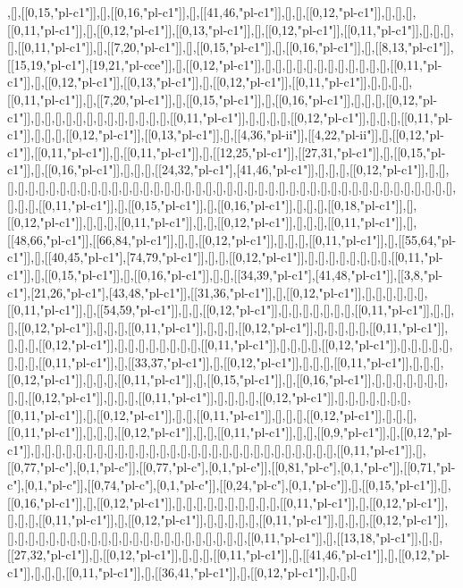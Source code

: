 ,[],[[0,15,"pl-c1"]],[],[[0,16,"pl-c1"]],[],[[41,46,"pl-c1"]],[],[],[[0,12,"pl-c1"]],[],[],[],[[0,11,"pl-c1"]],[],[[0,12,"pl-c1"]],[[0,13,"pl-c1"]],[],[[0,12,"pl-c1"]],[[0,11,"pl-c1"]],[],[],[],[],[[0,11,"pl-c1"]],[],[[7,20,"pl-c1"]],[],[[0,15,"pl-c1"]],[],[[0,16,"pl-c1"]],[],[[8,13,"pl-c1"]],[[15,19,"pl-c1"],[19,21,"pl-cce"]],[],[[0,12,"pl-c1"]],[],[],[],[],[],[],[],[],[],[],[],[],[[0,11,"pl-c1"]],[],[[0,12,"pl-c1"]],[[0,13,"pl-c1"]],[],[[0,12,"pl-c1"]],[[0,11,"pl-c1"]],[],[],[],[],[[0,11,"pl-c1"]],[],[[7,20,"pl-c1"]],[],[[0,15,"pl-c1"]],[],[[0,16,"pl-c1"]],[],[],[],[[0,12,"pl-c1"]],[],[],[],[],[],[],[],[],[],[],[],[],[],[[0,11,"pl-c1"]],[],[],[],[],[[0,12,"pl-c1"]],[],[],[],[[0,11,"pl-c1"]],[],[],[],[[0,12,"pl-c1"]],[[0,13,"pl-c1"]],[],[[4,36,"pl-ii"]],[[4,22,"pl-ii"]],[],[[0,12,"pl-c1"]],[[0,11,"pl-c1"]],[],[[0,11,"pl-c1"]],[],[[12,25,"pl-c1"]],[[27,31,"pl-c1"]],[],[[0,15,"pl-c1"]],[],[[0,16,"pl-c1"]],[],[],[],[[24,32,"pl-c1"],[41,46,"pl-c1"]],[],[],[],[[0,12,"pl-c1"]],[],[],[],[],[],[],[],[],[],[],[],[],[],[],[],[],[],[],[],[],[],[],[],[],[],[],[],[],[],[],[],[],[],[],[],[],[],[],[],[],[],[],[],[],[],[],[],[],[[0,11,"pl-c1"]],[],[[0,15,"pl-c1"]],[],[[0,16,"pl-c1"]],[],[],[],[[0,18,"pl-c1"]],[],[[0,12,"pl-c1"]],[],[],[],[[0,11,"pl-c1"]],[],[],[[0,12,"pl-c1"]],[],[],[],[[0,11,"pl-c1"]],[],[[48,66,"pl-c1"]],[[66,84,"pl-c1"]],[],[],[[0,12,"pl-c1"]],[],[],[],[[0,11,"pl-c1"]],[],[[55,64,"pl-c1"]],[],[[40,45,"pl-c1"],[74,79,"pl-c1"]],[],[],[[0,12,"pl-c1"]],[],[],[],[],[],[],[],[],[[0,11,"pl-c1"]],[],[[0,15,"pl-c1"]],[],[[0,16,"pl-c1"]],[],[],[[34,39,"pl-c1"],[41,48,"pl-c1"]],[[3,8,"pl-c1"],[21,26,"pl-c1"],[43,48,"pl-c1"]],[[31,36,"pl-c1"]],[],[[0,12,"pl-c1"]],[],[],[],[],[],[],[[0,11,"pl-c1"]],[],[[54,59,"pl-c1"]],[],[],[[0,12,"pl-c1"]],[],[],[],[],[],[],[],[[0,11,"pl-c1"]],[],[],[],[[0,12,"pl-c1"]],[],[],[],[[0,11,"pl-c1"]],[],[],[],[[0,12,"pl-c1"]],[],[],[],[],[],[[0,11,"pl-c1"]],[],[],[],[[0,12,"pl-c1"]],[],[],[],[],[],[],[],[],[[0,11,"pl-c1"]],[],[],[],[],[[0,12,"pl-c1"]],[],[],[],[],[],[],[],[],[[0,11,"pl-c1"]],[],[[33,37,"pl-c1"]],[],[[0,12,"pl-c1"]],[],[],[],[[0,11,"pl-c1"]],[],[],[],[[0,12,"pl-c1"]],[],[],[],[[0,11,"pl-c1"]],[],[[0,15,"pl-c1"]],[],[[0,16,"pl-c1"]],[],[],[],[],[],[],[],[],[],[[0,12,"pl-c1"]],[],[],[],[[0,11,"pl-c1"]],[],[],[],[],[[0,12,"pl-c1"]],[],[],[],[],[],[],[],[[0,11,"pl-c1"]],[],[[0,12,"pl-c1"]],[],[],[[0,11,"pl-c1"]],[],[],[],[[0,12,"pl-c1"]],[],[],[],[[0,11,"pl-c1"]],[],[],[],[[0,12,"pl-c1"]],[],[],[[0,11,"pl-c1"]],[],[],[[0,9,"pl-c1"]],[],[[0,12,"pl-c1"]],[],[],[],[],[],[],[],[],[],[],[],[],[],[],[],[],[],[],[],[],[],[],[],[],[],[],[],[],[],[[0,11,"pl-c1"]],[],[[0,77,"pl-c"],[0,1,"pl-c"]],[[0,77,"pl-c"],[0,1,"pl-c"]],[[0,81,"pl-c"],[0,1,"pl-c"]],[[0,71,"pl-c"],[0,1,"pl-c"]],[[0,74,"pl-c"],[0,1,"pl-c"]],[[0,24,"pl-c"],[0,1,"pl-c"]],[],[[0,15,"pl-c1"]],[],[[0,16,"pl-c1"]],[],[[0,12,"pl-c1"]],[],[],[],[],[],[],[],[],[],[],[[0,11,"pl-c1"]],[],[[0,12,"pl-c1"]],[],[],[],[[0,11,"pl-c1"]],[],[[0,12,"pl-c1"]],[],[],[],[],[],[[0,11,"pl-c1"]],[],[],[],[[0,12,"pl-c1"]],[],[],[],[],[],[],[],[],[],[],[],[],[],[],[],[],[],[],[],[],[],[],[],[[0,11,"pl-c1"]],[],[[13,18,"pl-c1"]],[],[],[[27,32,"pl-c1"]],[],[[0,12,"pl-c1"]],[],[],[],[[0,11,"pl-c1"]],[],[[41,46,"pl-c1"]],[],[[0,12,"pl-c1"]],[],[],[],[[0,11,"pl-c1"]],[],[[36,41,"pl-c1"]],[],[[0,12,"pl-c1"]],[],[],[]